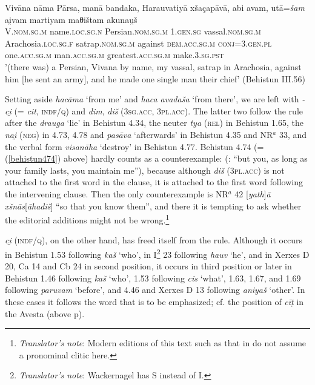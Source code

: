 \begin{exe}
\ex 
\gll Vivāna nāma Pārsa, manā bandaka, Harauvatiyā xšaçapāvā, abi avam, utā=\emph{šam} ai̯vam martiyam maθištam akunau̯š\\
V.\textsc{nom.sg.m} name.\textsc{loc.sg.n} Persian.\textsc{nom.sg.m} \textsc{1.gen.sg} vassal.\textsc{nom.sg.m} Arachosia.\textsc{loc.sg.f} satrap.\textsc{nom.sg.m} against \textsc{dem.acc.sg.m} \textsc{conj}=\textsc{3.gen.pl} one.\textsc{acc.sg.m} man.\textsc{acc.sg.m} greatest.\textsc{acc.sg.m} make.\textsc{3.sg.pst}\\
\trans '(there was) a Persian, Vivana by name, my vassal, satrap in Arachosia, against him {[}he sent an army{]}, and he made one single man their chief' (Behistun III.56)
\label{behistun356}
\end{exe}

Setting aside \emph{hacāma} `from me' and \emph{haca avadaša} `from there', we are left with \emph{-ci̯} (=  \emph{cit}, \textsc{indf/q}) and \emph{dim}, \emph{diš} (\textsc{3sg.acc}, \textsc{3pl.acc}). The latter two follow the rule after the  \emph{drauga} `lie' in Behistun 4.34, the neuter \emph{tya} (\textsc{rel}) in Behistun 1.65, the  \emph{nai̯} (\textsc{neg}) in 4.73, 4.78 and \emph{pasāva} `afterwards' in Behistun 4.35 and NR$^a$ 33, and the verbal form \emph{visanāha} `destroy' in Behistun 4.77. Behistun 4.74 (=(\ref{behistun474}) above) hardly counts as a counterexample: (\citealp{Spiegel1881}: ``but you, as long as your family lasts, you maintain me''), because although \emph{diš} (\textsc{3pl.acc}) is not attached to the first word in the clause, it is attached to the first word following the intervening clause. Then the only counterexample is NR$^a$ 42 {[}\textit{yath}{]}\textit{ā xšnās}{[}\textit{āha\emph{diš}}{]} ``so that you know them'', and there it is tempting to ask whether the editorial additions might not be wrong.\footnote{\emph{Translator's note}: Modern editions of this text such as that in \citet[137]{Kent1953} do not assume a pronominal clitic here.} 

\emph{ci̯} (\textsc{indf/q}), on the other hand, has freed itself from the rule. Although it occurs in Behistun 1.53 following \emph{kaš} `who', in I\footnote{\emph{Translator's note}: Wackernagel has S instead of I.} 23 following \emph{hauv} `he', and in Xerxes D 20, Ca 14 and Cb 24 in second position, it occurs in third position or later in Behistun 1.46 following \emph{kaš} `who', 1.53 following \emph{cis} `what', 1.63, 1.67, and 1.69 following \emph{paruvam} `before', and 4.46 and Xerxes D 13 following \emph{aniyaš} `other'. In these cases it follows the word that is to be emphasized; cf. the position of \emph{cīṭ} in the Avesta (above p\pageref{cit}).

